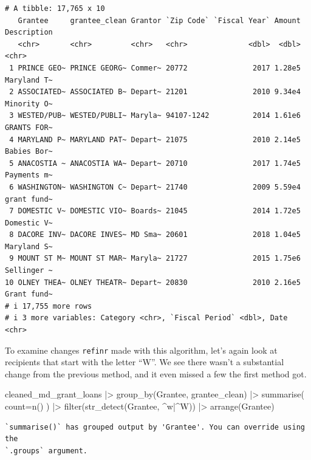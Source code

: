 \documentclass[
  letterpaper,
  DIV=11,
  numbers=noendperiod]{scrreprt}
\newenvironment{Shaded}{\begin{snugshade}}{\end{snugshade}}
\newcommand{\AttributeTok}[1]{\textcolor[rgb]{0.40,0.45,0.13}{#1}}
\newcommand{\FunctionTok}[1]{\textcolor[rgb]{0.28,0.35,0.67}{#1}}
\newcommand{\NormalTok}[1]{\textcolor[rgb]{0.00,0.23,0.31}{#1}}
\newcommand{\SpecialCharTok}[1]{\textcolor[rgb]{0.37,0.37,0.37}{#1}}
\newcommand{\StringTok}[1]{\textcolor[rgb]{0.13,0.47,0.30}{#1}}
\begin{document}
\begin{verbatim}
# A tibble: 17,765 x 10
   Grantee     grantee_clean Grantor `Zip Code` `Fiscal Year` Amount Description
   <chr>       <chr>         <chr>   <chr>              <dbl>  <dbl> <chr>      
 1 PRINCE GEO~ PRINCE GEORG~ Commer~ 20772               2017 1.28e5 Maryland T~
 2 ASSOCIATED~ ASSOCIATED B~ Depart~ 21201               2010 9.34e4 Minority O~
 3 WESTED/PUB~ WESTED/PUBLI~ Maryla~ 94107-1242          2014 1.61e6 GRANTS FOR~
 4 MARYLAND P~ MARYLAND PAT~ Depart~ 21075               2010 2.14e5 Babies Bor~
 5 ANACOSTIA ~ ANACOSTIA WA~ Depart~ 20710               2017 1.74e5 Payments m~
 6 WASHINGTON~ WASHINGTON C~ Depart~ 21740               2009 5.59e4 grant fund~
 7 DOMESTIC V~ DOMESTIC VIO~ Boards~ 21045               2014 1.72e5 Domestic V~
 8 DACORE INV~ DACORE INVES~ MD Sma~ 20601               2018 1.04e5 Maryland S~
 9 MOUNT ST M~ MOUNT ST MAR~ Maryla~ 21727               2015 1.75e6 Sellinger ~
10 OLNEY THEA~ OLNEY THEATR~ Depart~ 20830               2010 2.16e5 Grant fund~
# i 17,755 more rows
# i 3 more variables: Category <chr>, `Fiscal Period` <dbl>, Date <chr>
\end{verbatim}

To examine changes \texttt{refinr} made with this algorithm, let's again
look at recipients that start with the letter ``W''. We see there wasn't
a substantial change from the previous method, and it even missed a few
the first method got.

\begin{Shaded}
\begin{Highlighting}[]
\NormalTok{cleaned\_md\_grant\_loans }\SpecialCharTok{|\textgreater{}}
  \FunctionTok{group\_by}\NormalTok{(Grantee, grantee\_clean) }\SpecialCharTok{|\textgreater{}}
  \FunctionTok{summarise}\NormalTok{(}
    \AttributeTok{count=}\FunctionTok{n}\NormalTok{()}
\NormalTok{  ) }\SpecialCharTok{|\textgreater{}}
  \FunctionTok{filter}\NormalTok{(}\FunctionTok{str\_detect}\NormalTok{(Grantee, }\StringTok{\textquotesingle{}\^{}w|\^{}W\textquotesingle{}}\NormalTok{)) }\SpecialCharTok{|\textgreater{}}
  \FunctionTok{arrange}\NormalTok{(Grantee)}
\end{Highlighting}
\end{Shaded}

\begin{verbatim}
`summarise()` has grouped output by 'Grantee'. You can override using the
`.groups` argument.
\end{verbatim}
\end{document}
